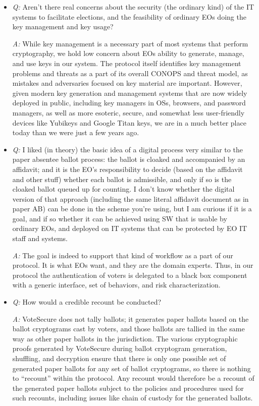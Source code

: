 \documentclass[12pt,letter]{article}
\begin{document}
\begin{itemize}

    \item \emph{Q:} Aren't there real concerns about the security (the ordinary kind) of the IT systems to facilitate elections, and the feasibility of ordinary EOs doing the key management and key usage?

    \emph{A:} While key management is a necessary part of most systems that perform cryptography, we hold low concern about EOs ability to generate, manage, and use keys in our system.  The protocol itself identifies key management problems and threats as a part of its overall CONOPS and threat model, as mistakes and adversaries focused on key material are important. However, given modern key generation and management systems that are now widely deployed in public, including key managers in OSs, browsers, and password managers, as well as more esoteric, secure, and somewhat less user-friendly devices like Yubikeys and Google Titan keys, we are in a much better place today than we were just a few years ago.

    \item \emph{Q:} I liked (in theory) the basic idea of a digital process very similar to the paper absentee ballot process: the ballot is cloaked and accompanied by an affidavit; and it is the EO's responsibility to decide (based on the affidavit and other stuff) whether each ballot is admissible, and only if so is the cloaked ballot queued up for counting. I don't know whether the digital version of that approach (including the same literal affidavit document as in paper AB) can be done in the scheme you're using, but I am curious if it is a goal, and if so whether it can be achieved using SW that is usable by ordinary EOs, and deployed on IT systems that can be protected by EO IT staff and systems.

    \emph{A:} The goal is indeed to support that kind of workflow as a part of our protocol.  It is what EOs want, and they are the domain experts.  Thus, in our protocol the authentication of voters is delegated to a black box component with a generic interface, set of behaviors, and risk characterization.

    \item \emph{Q:} How would a credible recount be conducted?

    \emph{A:} VoteSecure does not tally ballots; it generates paper ballots based on the ballot cryptograms cast by voters, and those ballots are tallied in the same way as other paper ballots in the jurisdiction. The various cryptographic proofs generated by VoteSecure during ballot cryptogram generation, shuffling, and decryption ensure that there is only one possible set of generated paper ballots for any set of ballot cryptograms, so there is nothing to ``recount'' within the protocol. Any recount would therefore be a recount of the generated paper ballots subject to the policies and procedures used for such recounts, including issues like chain of custody for the generated ballots.


\end{itemize}
\end{document}
